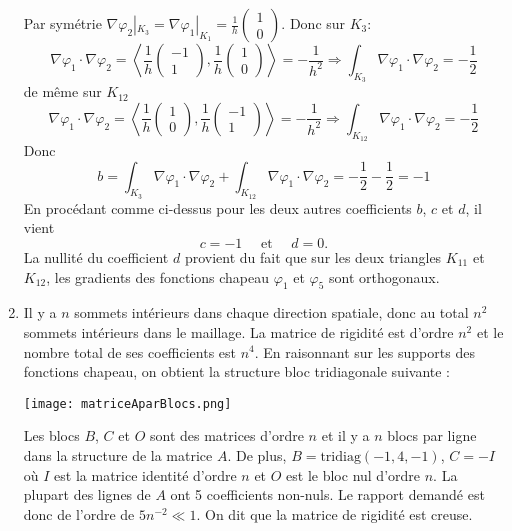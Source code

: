 \documentclass{article}
\begin{document}
\begin{enumerate}
Par symétrie $\nabla\varphi_2|_{K_3}=\nabla\varphi_1|_{K_1}=\frac{1}{h}\left(\begin{array}{c}1\\0 \end{array}\right)$. Donc sur $K_3$:
\[\nabla\varphi_1\cdot\nabla\varphi_2=\left<\frac 1h\left(\begin{array}{c}-1\\1 \end{array}\right),\frac 1h\left(\begin{array}{c}1\\0 \end{array}\right)\right>=-\frac{1}{h^2}\Longrightarrow \int_{K_3} \nabla\varphi_1\cdot\nabla\varphi_2 =-\frac 12\]
de même sur $K_{12}$
\[\nabla\varphi_1\cdot\nabla\varphi_2=\left<\frac 1h\left(\begin{array}{c}1\\0 \end{array}\right),\frac 1h\left(\begin{array}{c}-1\\1 \end{array}\right)\right>=-\frac{1}{h^2}\Longrightarrow \int_{K_{12}} \nabla\varphi_1\cdot\nabla\varphi_2 =-\frac 12\]
Donc
\[b=\int_{K_3} \nabla\varphi_1\cdot\nabla\varphi_2 + \int_{K_{12}} \nabla\varphi_1\cdot\nabla\varphi_2 =-\frac 12-\frac 12=-1\]
En procédant comme ci-dessus pour les deux autres coefficients $b$, $c$ et $d$, il vient
\[ c = -1\quad\mbox{ et }\quad d = 0.\]
La nullité du coefficient $d$ provient du fait que sur les deux triangles $K_{11}$ et $K_{12}$, les gradients des fonctions chapeau $\varphi_1$ et $\varphi_5$ sont orthogonaux.

\item Il y a $n$ sommets intérieurs dans chaque direction spatiale, donc au total $n^2$ sommets intérieurs dans le maillage. La matrice de rigidité est d'ordre $n^2$ et le nombre total de ses coefficients est $n^4$. En raisonnant sur les supports des fonctions chapeau, on obtient la structure bloc tridiagonale suivante :
\begin{center}
\texttt{[image: matriceAparBlocs.png]} 
\end{center}
Les blocs $B$, $C$ et $O$ sont des matrices d'ordre $n$ et il y a $n$ blocs par ligne dans la structure de la matrice $A$. De plus, $B = \mbox{tridiag}(-1, 4, -1)$, $C = -I$ où $I$ est la matrice identité d'ordre
$n$ et $O$ est le bloc nul d'ordre $n$. La plupart des lignes de $A$ ont 5 coefficients non-nuls. Le rapport demandé est donc de l'ordre de $5n^{-2}\ll 1$. On dit que la matrice de rigidité est creuse.
\end{enumerate}
\end{document}
